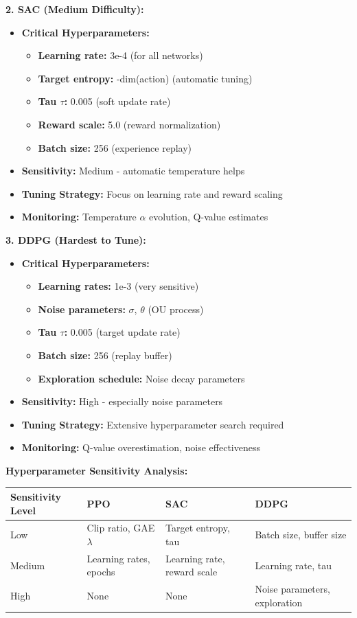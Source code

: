 \documentclass[12pt]{article}
\begin{document}
{{{\textbf{2. SAC (Medium Difficulty):}
\begin{itemize}
    \item \textbf{Critical Hyperparameters:}
    \begin{itemize}
        \item \textbf{Learning rate:} 3e-4 (for all networks)
        \item \textbf{Target entropy:} -dim(action) (automatic tuning)
        \item \textbf{Tau $\tau$:} 0.005 (soft update rate)
        \item \textbf{Reward scale:} 5.0 (reward normalization)
        \item \textbf{Batch size:} 256 (experience replay)
    \end{itemize}
    \item \textbf{Sensitivity:} Medium - automatic temperature helps
    \item \textbf{Tuning Strategy:} Focus on learning rate and reward scaling
    \item \textbf{Monitoring:} Temperature $\alpha$ evolution, Q-value estimates
\end{itemize}

\textbf{3. DDPG (Hardest to Tune):}
\begin{itemize}
    \item \textbf{Critical Hyperparameters:}
    \begin{itemize}
        \item \textbf{Learning rates:} 1e-3 (very sensitive)
        \item \textbf{Noise parameters:} $\sigma$, $\theta$ (OU process)
        \item \textbf{Tau $\tau$:} 0.005 (target update rate)
        \item \textbf{Batch size:} 256 (replay buffer)
        \item \textbf{Exploration schedule:} Noise decay parameters
    \end{itemize}
    \item \textbf{Sensitivity:} High - especially noise parameters
    \item \textbf{Tuning Strategy:} Extensive hyperparameter search required
    \item \textbf{Monitoring:} Q-value overestimation, noise effectiveness
\end{itemize}

\textbf{Hyperparameter Sensitivity Analysis:}

\begin{table}[h]
\centering
\begin{tabular}{|l|l|l|l|}
\hline
\textbf{Sensitivity Level} & \textbf{PPO} & \textbf{SAC} & \textbf{DDPG} \\
\hline
Low & Clip ratio, GAE $\lambda$ & Target entropy, tau & Batch size, buffer size \\
Medium & Learning rates, epochs & Learning rate, reward scale & Learning rate, tau \\
High & None & None & Noise parameters, exploration \\
\hline
\end{tabular}
\end{table}

}}}
\end{document}

